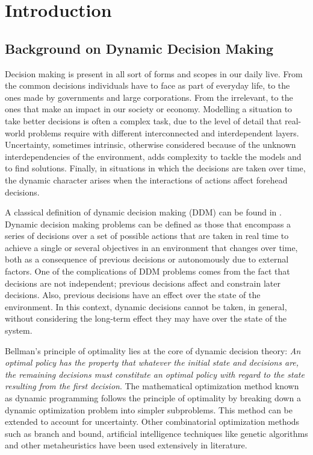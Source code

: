 
\chapter{Introduction} %
\label{Introduction}


\section{Background on Dynamic Decision Making}
Decision making is present in all sort of forms and scopes in our daily live. From the  common decisions individuals have to face as part of everyday life, to the ones made by governments and large corporations. From the irrelevant, to the ones that make an impact in our society or economy. Modelling a situation to take better decisions is often a complex task, due to the level of detail that real-world problems require with different interconnected and interdependent layers. Uncertainty, sometimes intrinsic, otherwise considered because of the unknown interdependencies of the environment, adds complexity to tackle the models and to find solutions. Finally, in situations in which the decisions are taken over time, the dynamic character arises when the interactions of actions affect forehead decisions.

A classical definition of dynamic decision making (DDM) can be found in  \cite{Edwards62}. Dynamic decision making problems can be defined as those that encompass a series of decisions over a set of possible actions that are taken in real time to achieve a single or several objectives in an environment that changes over time, both as a consequence of previous decisions or autonomously due to external factors. One of the complications of DDM problems comes from the fact that decisions are not independent; previous decisions affect and constrain later decisions. Also, previous decisions have an effect over the state of the environment. In this context, dynamic decisions cannot be taken, in general, without considering the long-term effect they may have over the state of the system. %


Bellman's principle of optimality \cite{Bellman:1957} lies at the core of dynamic decision theory: \emph{An optimal policy has the property that whatever the initial state and decisions are, the remaining decisions must constitute an optimal policy with regard to the state resulting from the first decision}. The mathematical optimization method known as dynamic programming follows the principle of optimality by breaking down a dynamic optimization problem into simpler subproblems. This method can be extended to account for uncertainty. Other combinatorial optimization methods such as branch and bound, artificial intelligence techniques like genetic algorithms and other metaheuristics have been used extensively in literature.

